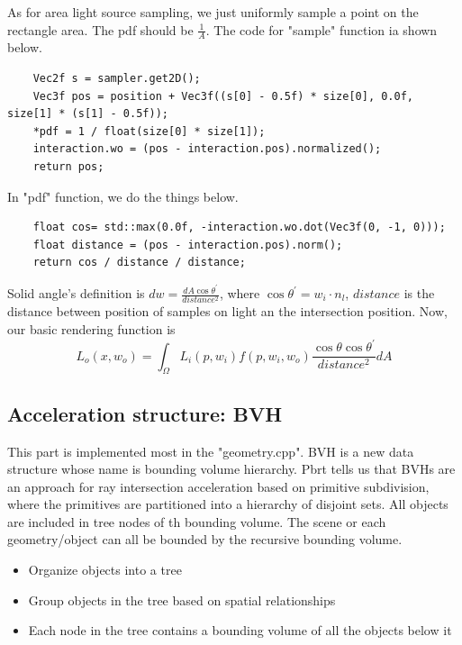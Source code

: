 \documentclass[acmtog]{acmart}
\begin{document}
As for area light source sampling, we just uniformly sample a point on the rectangle area. The pdf should be $\frac{1}{A}$. The code for "sample" function ia shown below.
\begin{lstlisting}
	Vec2f s = sampler.get2D();
 	Vec3f pos = position + Vec3f((s[0] - 0.5f) * size[0], 0.0f, size[1] * (s[1] - 0.5f));
    *pdf = 1 / float(size[0] * size[1]);
    interaction.wo = (pos - interaction.pos).normalized();
    return pos;
\end{lstlisting}

In "pdf" function, we do the things below. 
\begin{lstlisting}
	float cos= std::max(0.0f, -interaction.wo.dot(Vec3f(0, -1, 0)));
	float distance = (pos - interaction.pos).norm();
	return cos / distance / distance;
\end{lstlisting}
Solid angle's definition is $dw = \frac{dA \cos\theta^{'}}{distance^2}$, where 
$\cos\theta^{'} = w_i \cdot n_{l}$, $distance$ is the distance between position of samples on light an the intersection position. 
Now, our basic rendering function is $$L_o(x,w_o) = \int_{\Omega}L_i(p,w_i)f(p,w_i,w_o)\frac{\cos\theta\cos\theta^{'}}{distance^2}dA$$

\subsection{Acceleration structure: BVH}
\quad This part is implemented most in the "geometry.cpp". 
BVH is a new data structure whose name is bounding volume hierarchy.
Pbrt tells us that BVHs are an approach for ray intersection acceleration based on primitive subdivision, 
where the primitives are partitioned into a hierarchy of disjoint sets. All objects
are included in tree nodes of th bounding volume. The scene or each geometry/object can all be bounded by the recursive bounding volume.
\begin{itemize}
\item Organize objects into a tree
\item Group objects in the tree based on spatial relationships
\item Each node in the tree contains a bounding volume of all the objects below it
\end{itemize}
\end{document}
